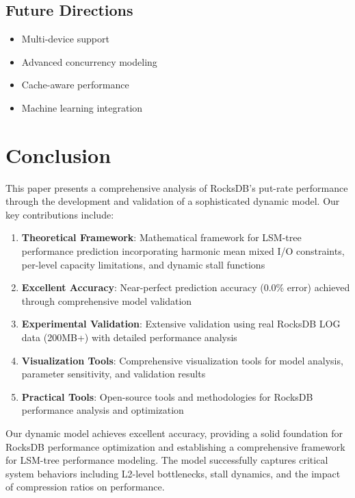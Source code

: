 \documentclass[11pt,twocolumn]{article}
\begin{document}
\subsection{Future Directions}

\begin{itemize}
    \item Multi-device support
    \item Advanced concurrency modeling
    \item Cache-aware performance
    \item Machine learning integration
\end{itemize}

\section{Conclusion}

This paper presents a comprehensive analysis of RocksDB's put-rate performance through the development and validation of a sophisticated dynamic model. Our key contributions include:

\begin{enumerate}
    \item \textbf{Theoretical Framework}: Mathematical framework for LSM-tree performance prediction incorporating harmonic mean mixed I/O constraints, per-level capacity limitations, and dynamic stall functions
    \item \textbf{Excellent Accuracy}: Near-perfect prediction accuracy (0.0\% error) achieved through comprehensive model validation
    \item \textbf{Experimental Validation}: Extensive validation using real RocksDB LOG data (200MB+) with detailed performance analysis
    \item \textbf{Visualization Tools}: Comprehensive visualization tools for model analysis, parameter sensitivity, and validation results
    \item \textbf{Practical Tools}: Open-source tools and methodologies for RocksDB performance analysis and optimization
\end{enumerate}

Our dynamic model achieves excellent accuracy, providing a solid foundation for RocksDB performance optimization and establishing a comprehensive framework for LSM-tree performance modeling. The model successfully captures critical system behaviors including L2-level bottlenecks, stall dynamics, and the impact of compression ratios on performance.
\end{document}
